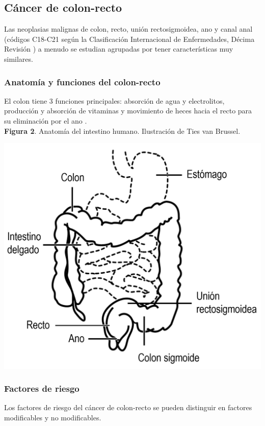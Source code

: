 \subsection{Cáncer de colon-recto}

Las neoplasias malignas de colon, recto, unión rectosigmoidea, ano y canal anal (códigos C18-C21 según la Clasificación Internacional de Enfermedades, Décima Revisión \cite{ICD10, cie10es}) a menudo se estudian agrupadas por tener características muy similares.

\subsubsection{Anatomía y funciones del colon-recto}

El colon tiene 3 funciones principales: absorción de agua y electrolitos, producción y absorción de vitaminas y movimiento de heces hacia el recto para su eliminación por el ano \cite{Azzouz2020}.\\

\textbf{Figura 2}. Anatomía del intestino humano. Ilustración de Ties van Brussel.
\begin{center}
	\includegraphics[width=.70\textwidth]{figuras/02_anatomia_cr.png} \\
\end{center}

\subsubsection{Factores de riesgo}

Los factores de riesgo del cáncer de colon-recto  se pueden distinguir en factores modificables y no modificables.\\

